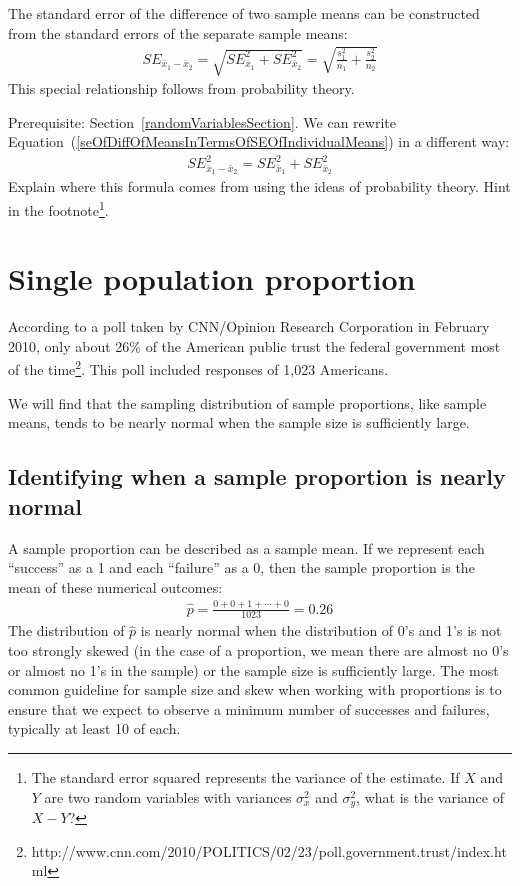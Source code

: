 The standard error of the difference of two sample means can be constructed from the standard errors of the separate sample means:
\begin{eqnarray}
SE_{\bar{x}_{1} - \bar{x}_{2}}
	= \sqrt{SE_{\bar{x}_1}^2 + SE_{\bar{x}_2}^2}
	= \sqrt{\frac{s_1^2}{{n_1}} + \frac{s_2^2}{{n_2}}}
\label{seOfDiffOfMeansInTermsOfSEOfIndividualMeans}
\end{eqnarray}
This special relationship follows from probability theory.

\begin{exercise} Prerequisite: Section~\ref{randomVariablesSection}.
We can rewrite Equation~(\ref{seOfDiffOfMeansInTermsOfSEOfIndividualMeans}) in a different way:
\begin{eqnarray*}
SE_{\bar{x}_{1} - \bar{x}_{2}}^2 = SE_{\bar{x}_1}^2 + SE_{\bar{x}_2}^2
\end{eqnarray*}
Explain where this formula comes from using the ideas of probability theory. Hint in the footnote\footnote{The standard error squared represents the variance of the estimate. If $X$ and $Y$ are two random variables with variances $\sigma_x^2$ and $\sigma_y^2$, what is the variance of $X-Y$?}.
\end{exercise}


\section{Single population proportion}
\label{singleProportion}

According to a poll taken by CNN/Opinion Research Corporation in February 2010, only about 26\% of the American public trust the federal government most of the time\footnote{http://www.cnn.com/2010/POLITICS/02/23/poll.government.trust/index.html}. This poll included responses of 1,023 Americans.

We will find that the sampling distribution of sample proportions, like sample means, tends to be nearly normal when the sample size is sufficiently large.

\subsection{Identifying when a sample proportion is nearly normal}

A sample proportion can be described as a sample mean. If we represent each ``success'' as a 1 and each ``failure'' as a 0, then the sample proportion is the mean of these numerical outcomes:
\begin{eqnarray*}
\hat{p} = \frac{0 + 0 + 1 + \cdots + 0}{1023} = 0.26
\end{eqnarray*}
The distribution of $\hat{p}$ is nearly normal when the distribution of 0's and 1's is not too strongly skewed (in the case of a proportion, we mean there are almost no 0's or almost no 1's in the sample) or the sample size is sufficiently large. The most common guideline for sample size and skew when working with proportions is to ensure that we expect to observe a minimum number of successes and failures, typically at least 10 of each.

